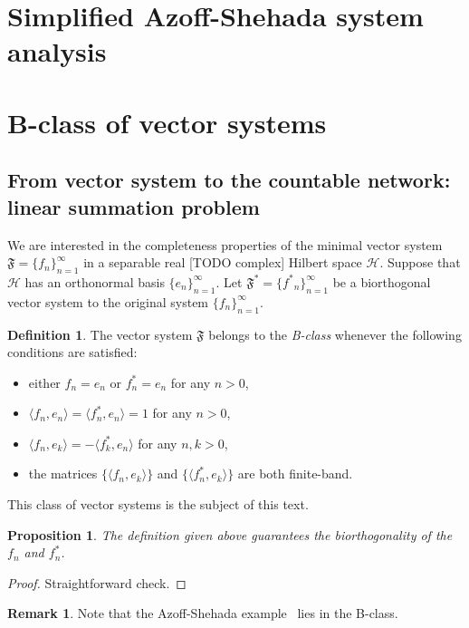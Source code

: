 \documentclass[12pt]{article}
\newcommand\inner[2]{\langle #1, #2 \rangle}
\renewcommand{\cal}[1]{\mathcal{#1}}
\newtheorem{prop}{Proposition}
\theoremstyle{definition}
\newtheorem{remark}{Remark}
\newtheorem{definition}{Definition}
\newcommand{\seq}[1]{\{{#1}_n\}_{n=1}^\infty}
\newcommand{\fsys}{\mathfrak{F}}
\newcommand{\fstarsys}{\mathfrak{F^{*}}}
\numberwithin{remark}{section}
\numberwithin{theorem}{section}
\numberwithin{prop}{section}
\numberwithin{equation}{section}
\numberwithin{lemma}{section}
\numberwithin{prop_under_lemma}{lemma}
\begin{document}


\section{Simplified Azoff-Shehada system analysis}

\section{B-class of vector systems}
  \subsection{From vector system to the countable network: linear summation problem}
    We are interested in the completeness properties of the minimal vector system $\fsys = \seq{f}$
      in a separable real [TODO complex] Hilbert space $\cal{H}$.
    Suppose that $\cal{H}$ has an orthonormal basis $\seq{e}$.
    Let $\fstarsys = \seq{f^*}$ be a biorthogonal vector system to the original system $\seq{f}$.
    \begin{definition}
        The vector system $\fsys$ belongs to the \textit{B-class} whenever the following conditions are satisfied:
        \begin{itemize}
            \item either $f_n = e_n$ or $f^*_n = e_n$ for any $n > 0$,
            \item $\inner{f_n}{e_n} = \inner{f^*_n}{e_n} = 1$ for any $n > 0$,
            \item $\inner{f_n}{e_k} = -\inner{f^*_k}{e_n}$ for any $n, k > 0$,
            \item the matrices $\{\inner{f_n}{e_k}\}$ and $\{\inner{f^*_n}{e_k}\}$ are both finite-band.
        \end{itemize}
    \end{definition}
    This class of vector systems is the subject of this text.
    \begin{prop}
        The definition given above guarantees the biorthogonality of the $f_n$ and $f^*_n$.
    \end{prop}
    \begin{proof}
        Straightforward check.
    \end{proof}
    \begin{remark}
        Note that the Azoff-Shehada example~\cite{azoff} lies in the B-class.
    \end{remark}
    
\end{document}
